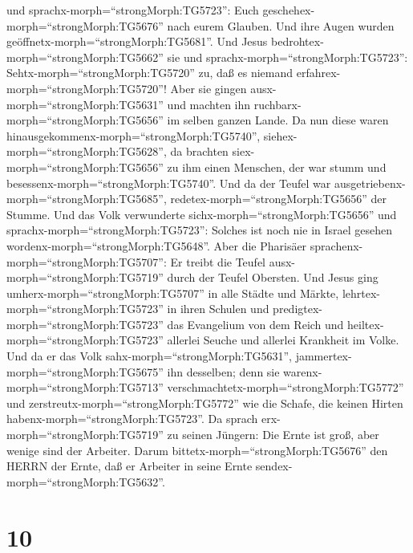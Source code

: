 und sprachx-morph=``strongMorph:TG5723'': Euch
geschehex-morph=``strongMorph:TG5676'' nach eurem Glauben. 
Und ihre Augen wurden geöffnetx-morph=``strongMorph:TG5681''. Und Jesus
bedrohtex-morph=``strongMorph:TG5662'' sie und
sprachx-morph=``strongMorph:TG5723'': Sehtx-morph=``strongMorph:TG5720''
zu, daß es niemand erfahrex-morph=``strongMorph:TG5720''! 
Aber sie gingen ausx-morph=``strongMorph:TG5631'' und machten ihn
ruchbarx-morph=``strongMorph:TG5656'' im selben ganzen Lande.
 Da nun diese waren
hinausgekommenx-morph=``strongMorph:TG5740'',
siehex-morph=``strongMorph:TG5628'', da brachten
siex-morph=``strongMorph:TG5656'' zu ihm einen Menschen, der war stumm
und besessenx-morph=``strongMorph:TG5740''.  Und da der
Teufel war ausgetriebenx-morph=``strongMorph:TG5685'',
redetex-morph=``strongMorph:TG5656'' der Stumme. Und das Volk
verwunderte sichx-morph=``strongMorph:TG5656'' und
sprachx-morph=``strongMorph:TG5723'': Solches ist noch nie in Israel
gesehen wordenx-morph=``strongMorph:TG5648''.  Aber die
Pharisäer sprachenx-morph=``strongMorph:TG5707'': Er treibt die Teufel
ausx-morph=``strongMorph:TG5719'' durch der Teufel Obersten.
 Und Jesus ging umherx-morph=``strongMorph:TG5707'' in alle
Städte und Märkte, lehrtex-morph=``strongMorph:TG5723'' in ihren Schulen
und predigtex-morph=``strongMorph:TG5723'' das Evangelium von dem Reich
und heiltex-morph=``strongMorph:TG5723'' allerlei Seuche und allerlei
Krankheit im Volke.  Und da er das Volk
sahx-morph=``strongMorph:TG5631'',
jammertex-morph=``strongMorph:TG5675'' ihn desselben; denn sie
warenx-morph=``strongMorph:TG5713''
verschmachtetx-morph=``strongMorph:TG5772'' und
zerstreutx-morph=``strongMorph:TG5772'' wie die Schafe, die keinen
Hirten habenx-morph=``strongMorph:TG5723''.  Da sprach
erx-morph=``strongMorph:TG5719'' zu seinen Jüngern: Die Ernte ist groß,
aber wenige sind der Arbeiter.  Darum
bittetx-morph=``strongMorph:TG5676'' den HERRN der Ernte, daß er
Arbeiter in seine Ernte sendex-morph=``strongMorph:TG5632''.

\hypertarget{section-9}{%
\section{10}\label{section-9}}

